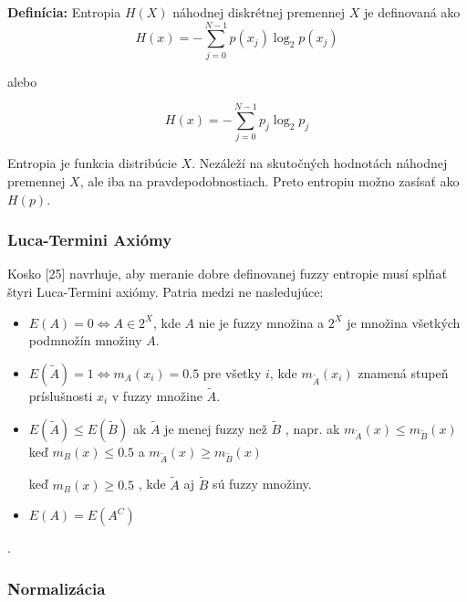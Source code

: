 \textbf{Definícia:}  Entropia $H(X)$ náhodnej diskrétnej premennej $X$ je definovaná ako 
$$H\left(x\right)=-\sum\limits_{j=0}^{N-1}p\left(x_j\right)\log_2p\left(x_j\right) $$

alebo

$$H\left(x\right)=-\sum\limits_{j=0}^{N-1}p_j
\log_2p_j$$

Entropia je funkcia distribúcie $X$. Nezáleží na skutočných hodnotách náhodnej premennej $X$, ale iba na pravdepodobnostiach. Preto entropiu možno zasísať ako $H(p)$.
\subsubsection{Luca-Termini Axiómy}
Kosko [25] navrhuje, aby meranie dobre definovanej fuzzy entropie musí splňať štyri Luca-Termini axiómy. Patria medzi ne nasledujúce:
\begin{itemize}
\item $E(A)=0 \iff A\in 2^X $, kde 
$A$ nie je fuzzy množina a $2^X$ je množina všetkých podmnožín množiny 
$A$. 

\item
$E(\tilde{A}) =1
\iff 
m_{{A}}(x_i) =0.5$
pre všetky $i$, kde 
$m_{\tilde{A}}(x_i)$
znamená stupeň príslušnosti 
$x_i$ 
v fuzzy množine 
$\tilde{A}$. 
\item
$E(\tilde{A}) \leq E(\tilde{B}) $
ak 
$\tilde{A}$
 je menej fuzzy než 
$\tilde{B}$
, napr. ak 
$m_{\tilde{A}}(x) \leq m_{\tilde{B}} (x)$
keď 
$m_B(x) \leq 0.5$
a 
$m_{\tilde{A}}(x) 
\geq 
m_{\tilde{B}}(x)$ 

keď 
$m_B(x) 
\geq
0.5$
, kde 
$\tilde{A}$
aj 
$\tilde{B}$
 sú fuzzy množiny. 
 
 \item
 
$E(A)=E(A^C)$

\end{itemize}




. 


\subsubsection*{Normalizácia }



